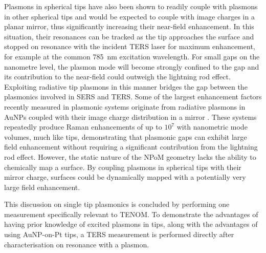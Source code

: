 \documentclass{article}
\begin{document}
Plasmons in spherical tips have also been shown to readily couple with plasmons in other spherical tips \cite{savage2012} and would be expected to couple with image charges in a planar mirror, thus significantly increasing their near-field enhancement. In this situation, their resonances can be tracked as the tip approaches the surface and stopped on resonance with the incident TERS laser for maximum enhancement, for example at the common \SI{785}{nm} excitation wavelength. For small gaps on the nanometre level, the plasmon mode will become strongly confined to the gap and its contribution to the near-field could outweigh the lightning rod effect.
Exploiting radiative tip plasmons in this manner bridges the gap between the plasmonics involved in SERS and TERS. Some of the largest enhancement factors recently measured in plasmonic systems originate from radiative plasmons in AuNPs coupled with their image charge distribution in a mirror \cite{mertens2013, taylor2014}. These systems repeatedly produce Raman enhancements of up to $10^7$ with nanometric mode volumes, much like tips, demonstrating that plasmonic gaps can exhibit large field enhancement without requiring a significant contribution from the lightning rod effect. However, the static nature of the NPoM geometry lacks the ability to chemically map a surface. By coupling plasmons in spherical tips with their mirror charge, surfaces could be dynamically mapped with a potentially very large field enhancement.

This discussion on single tip plasmonics is concluded by performing one measurement specifically relevant to TENOM. To demonstrate the advantages of having prior knowledge of excited plasmons in tips, along with the advantages of using AuNP-on-Pt tips, a TERS measurement is performed directly after characterisation on resonance with a plasmon.
\end{document}
